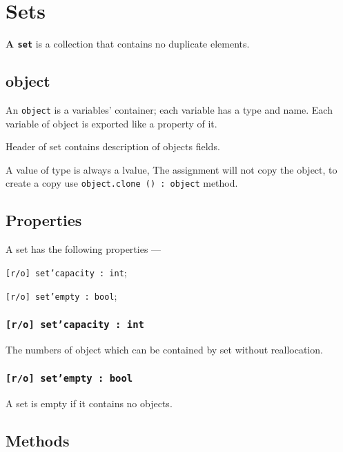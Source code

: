 \section{Sets}

{\bf A \texttt{set}} is a collection that contains no duplicate elements.

\subsection{object}

An \texttt{object} is a variables' container; each variable has a type and name. Each variable of object is exported like a property of it.

Header of set contains description of objects fields.

A value of type \object{} is always a lvalue, The assignment will not copy the object, to create a copy use \texttt{object.clone () : object} method.

\subsection{Properties}

A set has the following properties —
\begin{icItems}
\item \texttt{[r/o] set'capacity : int};
\item \texttt{[r/o] set'empty : bool};
\end{icItems}

\subsubsection{\texttt{[r/o] set'capacity : int}}

The numbers of object which can be contained by set without reallocation.

\subsubsection{\texttt{[r/o] set'empty : bool}}

A set is empty if it contains no objects.

\subsection{Methods}

